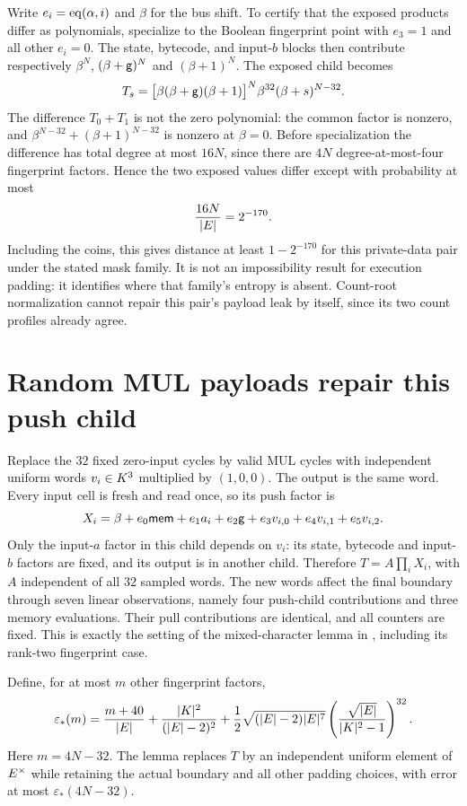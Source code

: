 \documentclass[11pt]{article}
\begin{document}
Write $e_i=\operatorname{eq}(\alpha,i)$ and $\beta$ for the bus shift. To certify that the exposed products differ as polynomials, specialize to the Boolean fingerprint point with $e_3=1$ and all other $e_i=0$. The state, bytecode, and input-$b$ blocks then contribute respectively $\beta^N$, $(\beta+\mathsf{g})^N$ and $(\beta+1)^N$. The exposed child becomes
\[
 T_s=\bigl[\beta(\beta+\mathsf{g})(\beta+1)\bigr]^N
       \beta^{32}(\beta+s)^{N-32}.
\]
The difference $T_0+T_1$ is not the zero polynomial: the common factor is nonzero, and $\beta^{N-32}+(\beta+1)^{N-32}$ is nonzero at $\beta=0$. Before specialization the difference has total degree at most $16N$, since there are $4N$ degree-at-most-four fingerprint factors. Hence the two exposed values differ except with probability at most
\[
 \frac{16N}{|E|}=2^{-170}.
\]
Including the coins, this gives distance at least $1-2^{-170}$ for this private-data pair under the stated mask family. It is not an impossibility result for execution padding: it identifies where that family's entropy is absent. Count-root normalization cannot repair this pair's payload leak by itself, since its two count profiles already agree.

\section{Random MUL payloads repair this push child}

Replace the $32$ fixed zero-input cycles by valid MUL cycles with independent uniform words $v_i\in K^3$ multiplied by $(1,0,0)$. The output is the same word. Every input cell is fresh and read once, so its push factor is
\[
 X_i=\beta+e_0\mathsf{mem}+e_1a_i+e_2\mathsf{g}+
       e_3v_{i,0}+e_4v_{i,1}+e_5v_{i,2}.
\]
Only the input-$a$ factor in this child depends on $v_i$: its state, bytecode and input-$b$ factors are fixed, and its output is in another child. Therefore $T=A\prod_iX_i$, with $A$ independent of all $32$ sampled words. The new words affect the final boundary through seven linear observations, namely four push-child contributions and three memory evaluations. Their pull contributions are identical, and all counters are fixed. This is exactly the setting of the mixed-character lemma in , including its rank-two fingerprint case.

Define, for at most $m$ other fingerprint factors,
\[
 \varepsilon_*(m)=\frac{m+40}{|E|}
 +\frac{|K|^2}{(|E|-2)^2}
 +\frac12\sqrt{(|E|-2)|E|^7}
   \left(\frac{\sqrt{|E|}}{|K|^2-1}\right)^{32}.
\]
Here $m=4N-32$. The lemma replaces $T$ by an independent uniform element of $E^\times$ while retaining the actual boundary and all other padding choices, with error at most $\varepsilon_*(4N-32)$.
\end{document}

